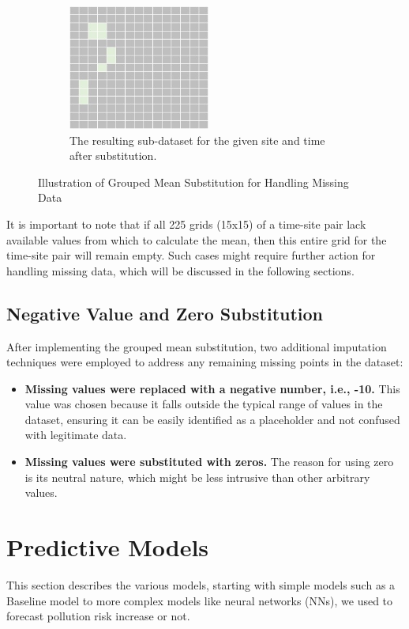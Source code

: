 \documentclass[a4paper,11pt]{report}
\begin{document}
\begin{figure}[H]
     \begin{subfigure}[b]{0.4\textwidth}
         \centering
         \includegraphics[height=4.1cm]{images/step3.jpg}
         \caption{The resulting sub-dataset for the given site and time after substitution.}
         \label{fig:step3}
     \end{subfigure}
        \caption{Illustration of Grouped Mean Substitution for Handling Missing Data}
        \label{fig:missing_mean}
\end{figure}

 It is important to note that if all 225 grids (15x15) of a time-site pair lack available values from which to calculate the mean, then this entire grid for the time-site pair will remain empty. Such cases might require further action for handling missing data, which will be discussed in the following sections.

\subsection{Negative Value and Zero Substitution}

After implementing the grouped mean substitution, two additional imputation techniques were employed to address any remaining missing points in the dataset: 

\begin{itemize}
    \item \textbf{Missing values were replaced with a negative number, i.e., -10.} This value was chosen because it falls outside the typical range of values in the dataset, ensuring it can be easily identified as a placeholder and not confused with legitimate data.
    \item \textbf{Missing values were substituted with zeros.} The reason for using zero is its neutral nature, which might be less intrusive than other arbitrary values.
\end{itemize}

\section{Predictive Models}
\label{sec:predictive}
This section describes the various models, starting with simple models such as a Baseline model to more complex models like neural
networks (NNs), we used to forecast pollution risk increase or not.
\end{document}
